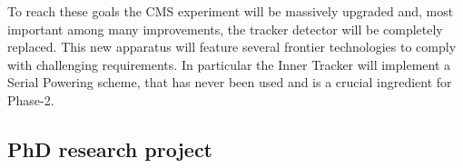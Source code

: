 \documentclass[a4paper,11pt,english]{article}
\begin{document}
To reach these goals the CMS experiment will be massively upgraded and, most important among many improvements, the tracker detector will be completely replaced. This new apparatus will feature several frontier technologies to comply with challenging requirements. In particular the Inner Tracker %
will implement a Serial Powering scheme, that has never been used and is a crucial ingredient for Phase-2. %

\subsection*{PhD research project}
\end{document}
